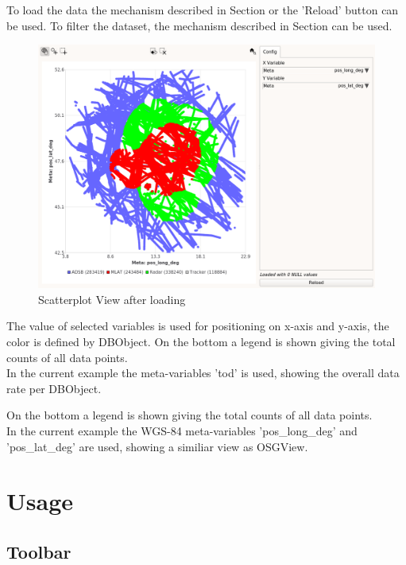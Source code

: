 To load the data the mechanism described in Section  or the 'Reload' button can be used. To filter the dataset, the mechanism described in Section  can be used. \\

\begin{figure}[H]
    \hspace*{-2cm}
    \includegraphics[width=18cm,frame]{../screenshots/scatter_loaded.png}
  \caption{Scatterplot View after loading}
\end{figure}

The value of selected variables is used for positioning on x-axis and y-axis, the color is defined by DBObject. On the bottom a legend is shown giving the total counts of all data points. \\

In the current example the meta-variables 'tod' is used, showing the overall data rate per DBObject.

On the bottom a legend is shown giving the total counts of all data points. \\

In the current example the WGS-84 meta-variables 'pos\_long\_deg' and 'pos\_lat\_deg' are used, showing a similiar view as OSGView.


\section{Usage}

\subsection{Toolbar}

